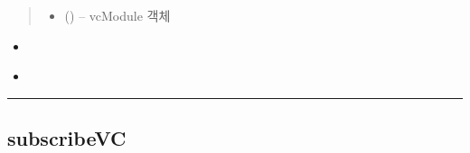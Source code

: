 \documentclass[a4paper,10pt,english]{sphinxmanual}
\begin{document}
\begin{fulllineitems}
\begin{fulllineitems}
\begin{quote}
\begin{description}
\begin{itemize}
\item {} 
\sphinxAtStartPar
{} ({\hyperref[\detokenize{_VCModule:vcModule}]{}}) – vcModule 객체

\end{itemize}

\end{description}\end{quote}


\nopagebreak

\begin{itemize}
\item {} 
\sphinxAtStartPar
{\hyperref[\detokenize{_VCModule:vcModule.reportCommit}]{}}

\item {} 
\sphinxAtStartPar
{}

\end{itemize}



\end{fulllineitems}


\end{fulllineitems}



\bigskip\hrule\bigskip



\subsection{subscribeVC}
\label{\detokenize{_VersionController:subscribevc}}
\end{document}
